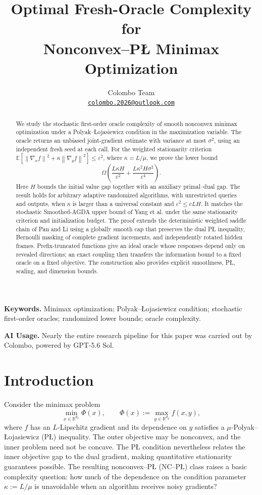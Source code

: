 \documentclass[11pt,a4paper]{article}
\title{Optimal Fresh-Oracle Complexity for\\Nonconvex--P\L{} Minimax Optimization}
\author{Colombo Team\\[3pt]
\normalsize\href{mailto:colombo.2026@outlook.com}{\texttt{colombo.2026@outlook.com}}}
\date{}
\newcommand{\R}{\mathbb R}
\newcommand{\E}{\mathbb E}
\newcommand{\eps}{\varepsilon}
\newcommand{\norm}[1]{\left\lVert #1\right\rVert}
\theoremstyle{definition}
\theoremstyle{remark}
\numberwithin{equation}{section}
\begin{document}
\maketitle

\begin{abstract}
We study the stochastic first-order oracle complexity of smooth nonconvex
minimax optimization under a Polyak--\L{}ojasiewicz condition in the
maximization variable. The oracle returns an unbiased joint-gradient
estimate with variance at most $\sigma^2$, using an independent fresh seed
at each call. For the weighted stationarity criterion
$\E[\norm{\nabla_x f}^2+\kappa\norm{\nabla_y f}^2]\le\eps^2$,
where $\kappa=L/\mu$, we prove the lower bound
\[
 \Omega\!\left(\frac{L\kappa H}{\eps^2}
       +\frac{L\kappa^2H\sigma^2}{\eps^4}\right).
\]
Here $H$ bounds the initial value gap together with an auxiliary
primal--dual gap. The result holds for arbitrary adaptive randomized
algorithms, with unrestricted queries and outputs, when $\kappa$ is
larger than a universal constant and $\eps^2\le cLH$.
It matches the stochastic Smoothed-AGDA upper bound of Yang et al.
under the same stationarity criterion and initialization budget.
The proof extends the deterministic weighted saddle chain of Pan and Li
using a globally smooth cap that preserves the dual P\L{} inequality,
Bernoulli masking of complete gradient increments, and independently
rotated hidden frames. Prefix-truncated functions give an ideal oracle
whose responses depend only on revealed directions; an exact coupling
then transfers the information bound to a fixed oracle on a fixed
objective. The construction also provides explicit smoothness,
P\L{}, scaling, and dimension bounds.
\end{abstract}

\noindent\textbf{Keywords.}
Minimax optimization; Polyak--\L{}ojasiewicz condition; stochastic first-order
oracles; randomized lower bounds; oracle complexity.

\begin{samepage}
\noindent\textbf{AI Usage.}
Nearly the entire research pipeline for this paper was carried out by
Colombo, powered by GPT-5.6 Sol.
\par
\end{samepage}

\section{Introduction}
\label{sec:introduction}

Consider the minimax problem
\[
 \min_{x\in\R^{d_x}}\Phi(x),\qquad
 \Phi(x):=\max_{y\in\R^{d_y}}f(x,y),
\]
where $f$ has an $L$-Lipschitz gradient and its dependence on $y$ satisfies
a $\mu$-Polyak--\L{}ojasiewicz (P\L{}) inequality. The outer objective may
be nonconvex, and the inner problem need not be concave. The P\L{}
condition nevertheless relates the inner objective gap to the dual
gradient, making quantitative stationarity guarantees possible.
The resulting nonconvex--P\L{} (NC--P\L{}) class raises a basic complexity
question: how much of the dependence on the condition parameter
$\kappa:=L/\mu$ is unavoidable when an algorithm receives noisy gradients?
\end{document}
